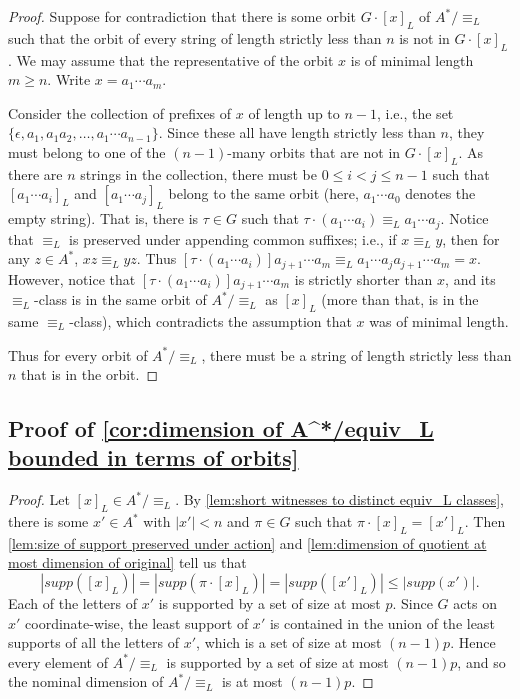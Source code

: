 \documentclass[11pt,a4paper]{amsart}
\theoremstyle{definition}
\begin{document}
\begin{proof}
    Suppose for contradiction that there is some orbit $G \cdot [x]_L$ of $A^* / \equiv_L$ such that the orbit of every string of length strictly less than $n$ is not in $G \cdot [x]_L$. 
    We may assume that the representative of the orbit $x$ is of minimal length $m \geq n$. 
    Write $x = a_1 \cdots a_m$. 

    Consider the collection of prefixes of $x$ of length up to $n-1$, i.e., the set $\{\epsilon, a_1, a_1 a_2, \ldots, a_1 \cdots a_{n-1}\}$.
    Since these all have length strictly less than $n$, they must belong to one of the $(n-1)$-many orbits that are not in $G \cdot [x]_L$. 
    As there are $n$ strings in the collection, there must be $0 \leq i < j \leq n-1$ such that $[a_1 \cdots a_i]_L$ and $[a_1 \cdots a_j]_L$ belong to the same orbit (here, $a_1 \cdots a_0$ denotes the empty string). 
    That is, there is $\tau \in G$ such that $\tau \cdot (a_1 \cdots a_i) \equiv_L a_1 \cdots a_j$. 
    Notice that $\equiv_L$ is preserved under appending common suffixes; i.e., if $x \equiv_L y$, then for any $z \in A^*$, $xz \equiv_L yz$. Thus $[\tau \cdot (a_1 \cdots a_i)] a_{j+1} \cdots a_m \equiv_L a_1 \cdots a_j a_{j+1} \cdots a_m = x$. 
    However, notice that $[\tau \cdot (a_1 \cdots a_i)] a_{j+1} \cdots a_m$ is strictly shorter than $x$, and its $\equiv_L$-class is in the same orbit of $A^* / \equiv_L$ as $[x]_L$ (more than that, is in the same $\equiv_L$-class), which contradicts the assumption that $x$ was of minimal length.

    Thus for every orbit of $A^* / \equiv_L$, there must be a string of length strictly less than $n$ that is in the orbit.
\end{proof}


\subsection{Proof of \autoref{cor:dimension of A^*/equiv_L bounded in terms of orbits}} \label{appendix:proof of dimension of A^*/equiv_L bounded in terms of orbits}

\begin{proof}
    Let $[x]_L \in A^* / \equiv_L$. 
    By \autoref{lem:short witnesses to distinct equiv_L classes}, there is some $x' \in A^*$ with $|x'| < n$ and $\pi \in G$ such that $\pi \cdot [x]_L = [x']_L$. 
    Then \autoref{lem:size of support preserved under action} and \autoref{lem:dimension of quotient at most dimension of original} tell us that 
    \[
        |supp([x]_L)| = |supp(\pi \cdot [x]_L)| = |supp([x']_L)| \leq |supp(x')|.
    \]
    Each of the letters of $x'$ is supported by a set of size at most $p$.
    Since $G$ acts on $x'$ coordinate-wise, the least support of $x'$ is contained in the union of the least supports of all the letters of $x'$, which is a set of size at most $(n-1)p$.
    Hence every element of $A^* / \equiv_L$ is supported by a set of size at most $(n-1)p$, and so the nominal dimension of $A^* / \equiv_L$ is at most $(n-1)p$.
\end{proof}
\end{document}
